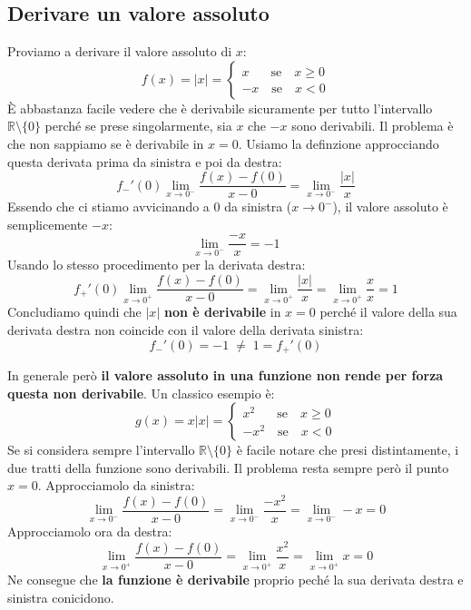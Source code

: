 \subsection{Derivare un valore assoluto} %
Proviamo a derivare il valore assoluto di $x$:
\begin{equation*}
    f(x) = |x| =
    \begin{cases*}
        x \quad \;\;\, \text{se} \quad x \geq 0\\
        -x \quad \text{se} \quad x < 0
    \end{cases*}
\end{equation*}
È abbastanza facile vedere che è derivabile sicuramente per tutto l'intervallo $\mathbb{R} \setminus \{0\}$ perché se prese singolarmente, sia $x$ che $-x$ sono derivabili. Il problema è che non sappiamo se è derivabile in $x = 0$. Usiamo la definzione approcciando questa derivata prima da sinistra e poi da destra:
\begin{equation*}
	f_-' (0) \lim_{x \to 0^-} \dfrac{f(x) - f(0)}{x -0} = \lim_{x \to 0^-} \dfrac{|x|}{x}
\end{equation*}
Essendo che ci stiamo avvicinando a $0$ da sinistra ($x \to 0^-$), il valore assoluto è semplicemente $-x$:
\begin{equation*}
	\lim_{x \to 0^-} \dfrac {-x}{x} = -1
\end{equation*} 
Usando lo stesso procedimento per la derivata destra:
\begin{equation*}
	f_+' (0) \lim_{x \to 0^+} \dfrac{f(x) - f(0)}{x -0} = \lim_{x \to 0^+} \dfrac{|x|}{x} = \lim_{x \to 0^+} \dfrac {x}{x} = 1
\end{equation*}
Concludiamo quindi che $|x|$ \textbf{non è derivabile} in $x = 0$ perché il valore della sua derivata destra non coincide con il valore della derivata sinistra:
\begin{equation*}
	f_-' (0) = -1 \; \neq \; 1 = f_+'(0)
\end{equation*}

In generale però \textbf{il valore assoluto in una funzione non rende per forza questa non derivabile}. Un classico esempio è:
\begin{equation*}
	g(x) = x|x| = 
	\begin{cases*}
		x^2 \quad \;\;\, \text{se} \quad x \geq 0\\
		-x^2 \quad \text{se} \quad x < 0
	\end{cases*}
\end{equation*}
Se si considera sempre l'intervallo $\mathbb{R} \setminus \{0\}$ è facile notare che presi distintamente, i due tratti della funzione sono derivabili. Il problema resta sempre però il punto $x = 0$. Approcciamolo da sinistra:
\begin{equation*}
	\lim_{x \to 0^-} \dfrac{f(x) - f(0)}{x - 0} = \lim_{x \to 0^-} \dfrac{-x^2}{x} = \lim_{x \to 0^-} -x = 0
\end{equation*}
Approcciamolo ora da destra:
\begin{equation*}
	\lim_{x \to 0^+} \dfrac{f(x) - f(0)}{x - 0} = \lim_{x \to 0^+} \dfrac{x^2}{x} = \lim_{x \to 0^+} x = 0
\end{equation*}
Ne consegue che \textbf{la funzione è derivabile} proprio peché la sua derivata destra e sinistra conicidono.

